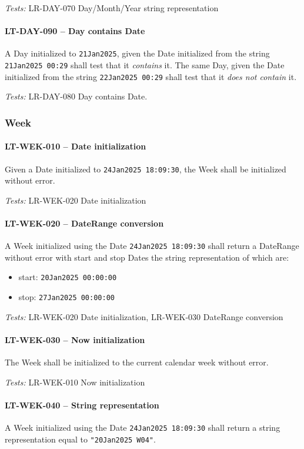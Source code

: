 \textit{Tests: } LR-DAY-070 Day/Month/Year string representation

\paragraph{LT-DAY-090 -- Day contains Date}
A Day initialized to \lstinline{21Jan2025}, given the
Date initialized from the string \lstinline{21Jan2025 00:29}
shall test that it \emph{contains} it. The same Day,
given the Date initialized from the string \lstinline{22Jan2025 00:29}
shall test that it \emph{does not contain} it.

\textit{Tests: } LR-DAY-080 Day contains Date.

\subsubsection{Week}
\paragraph{LT-WEK-010 -- Date initialization}
Given a Date initialized to \lstinline{24Jan2025 18:09:30}, the Week
shall be initialized without error.

\textit{Tests: } LR-WEK-020 Date initialization

\paragraph{LT-WEK-020 -- DateRange conversion}
A Week initialized using the Date \lstinline{24Jan2025 18:09:30} shall
return a DateRange without error with start and stop Dates the string
representation of which are:
\begin{itemize}
\item start: \lstinline{20Jan2025 00:00:00}
\item stop: \lstinline{27Jan2025 00:00:00}
\end{itemize}

\textit{Tests: } LR-WEK-020 Date initialization, LR-WEK-030 DateRange conversion

\paragraph{LT-WEK-030 -- Now initialization}
The Week shall be initialized to the current calendar week without error.

\textit{Tests: } LR-WEK-010 Now initialization

\paragraph{LT-WEK-040 -- String representation}
A Week initialized using the Date \lstinline{24Jan2025 18:09:30} shall
return a string representation equal to \lstinline{"20Jan2025 W04"}.

